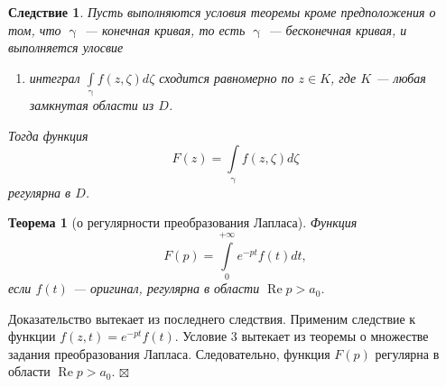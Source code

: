 \documentclass[a4paper, 12pt]{article}
\newenvironment{Proof} %
{\par\noindent{$\blacklozenge$}} %
{\hfill$\scriptstyle\boxtimes$}
\renewcommand{\gamma}{\upgamma}
\renewcommand{\Re}{\operatorname{Re}}
\newtheorem*{theorem}{Теорема}
\newtheorem*{cor}{Следствие}
\begin{document}
\begin{cor}
	Пусть выполняются условия теоремы кроме предположения о том, что $\gamma$ --- конечная кривая, то есть $\gamma$ --- бесконечная кривая, и выполняется улосвие \begin{enumerate}
		\item [3.] интеграл $\int\limits_\gamma f(z,\zeta)d\zeta$ сходится равномерно по $z \in K$, где $K$ --- любая замкнутая области из $D$. 
	\end{enumerate}
	Тогда функция $$F(z) = \int\limits_\gamma f(z,\zeta)d\zeta$$ регулярна в $D$.
\end{cor}
\begin{theorem}
	[о регулярности преобразования Лапласа]
	Функция $$F(p) = \int\limits_0^{+\infty}e^{-pt}f(t)dt,$$ если $f(t)$ --- оригинал, регулярна в области $\Re p > a_0$.
\end{theorem}\begin{Proof}
Доказательство вытекает из последнего следствия. Применим следствие к функции $f(z,t) = e^{-pt}f(t)$. Условие 3 вытекает из теоремы о множестве задания преобразования Лапласа. Следовательно, функция $F(p)$ регулярна в области $\Re p > a_0$.
\end{Proof}
\end{document}

